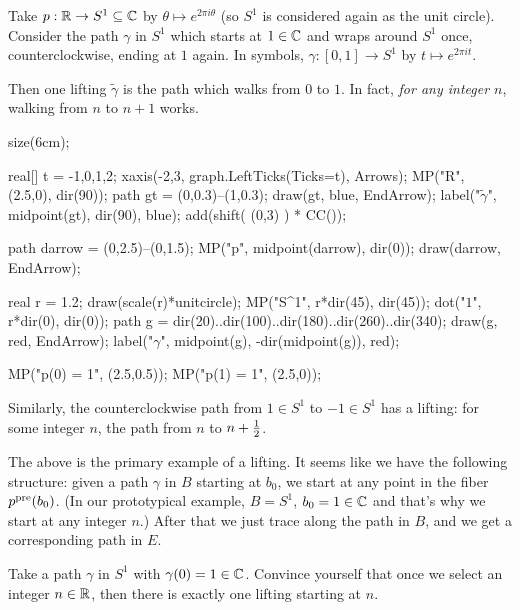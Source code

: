 \begin{example}
	Take $p : \mathbb R \to S^1 \subseteq \mathbb C$ by $\theta \mapsto e^{2 \pi i \theta}$
	(so $S^1$ is considered again as the unit circle).
	Consider the path $\gamma$ in $S^1$ which starts at $1 \in \mathbb C$
	and wraps around $S^1$ once, counterclockwise, ending at $1$ again.
	In symbols, $\gamma : [0,1] \to S^1$ by $t \mapsto e^{2\pi i t}$.

	Then one lifting $\tilde\gamma$ is the path which walks from $0$ to $1$.
	In fact, \emph{for any integer $n$}, walking from $n$ to $n+1$ works.

	\begin{center}
		\begin{asy}
			size(6cm);

			real[] t = {-1,0,1,2};
			xaxis(-2,3, graph.LeftTicks(Ticks=t), Arrows); 
			MP("\mathbb R", (2.5,0), dir(90));
			path gt = (0,0.3)--(1,0.3);
			draw(gt, blue, EndArrow);
			label("$\tilde\gamma$", midpoint(gt), dir(90), blue);
			add(shift( (0,3) ) * CC());

			path darrow = (0,2.5)--(0,1.5);
			MP("p", midpoint(darrow), dir(0));
			draw(darrow, EndArrow);

			real r = 1.2;
			draw(scale(r)*unitcircle);
			MP("S^1", r*dir(45), dir(45));
			dot("$1$", r*dir(0), dir(0));
			path g = dir(20)..dir(100)..dir(180)..dir(260)..dir(340);
			draw(g, red, EndArrow);
			label("$\gamma$", midpoint(g), -dir(midpoint(g)), red);

			MP("p(0) = 1", (2.5,0.5));
			MP("p(1) = 1", (2.5,0));
		\end{asy}
	\end{center}

	Similarly, the counterclockwise path from $1 \in S^1$ to $-1 \in S^1$
	has a lifting: for some integer $n$, the path from $n$ to $n+\frac{1}{2}$.
	\label{example:lifting_circle}
\end{example}

The above is the primary example of a lifting.
It seems like we have the following structure: given a path $\gamma$
in $B$ starting at $b_0$, we start at any point in the fiber $p^{\text{pre}}(b_0)$.
(In our prototypical example, $B = S^1$, $b_0 = 1 \in \mathbb C$
and that's why we start at any integer $n$.)
After that we just trace along the path in $B$, and we get
a corresponding path in $E$.
\begin{ques}
	Take a path $\gamma$ in $S^1$ with $\gamma(0) = 1 \in \mathbb C$.
	Convince yourself that once we select an integer $n \in \mathbb R$,
	then there is exactly one lifting starting at $n$.
\end{ques}

